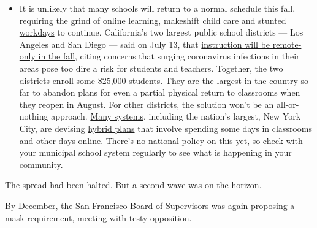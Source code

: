 \begin{itemize}
  \begin{itemize}
  \tightlist
  \item
    It is unlikely that many schools will return to a normal schedule
    this fall, requiring the grind of
    \href{https://www.nytimes3xbfgragh.onion/2020/06/05/us/coronavirus-education-lost-learning.html?action=click\&pgtype=Article\&state=default\&region=MAIN_CONTENT_3\&context=storylines_faq}{online
    learning},
    \href{https://www.nytimes3xbfgragh.onion/2020/05/29/us/coronavirus-child-care-centers.html?action=click\&pgtype=Article\&state=default\&region=MAIN_CONTENT_3\&context=storylines_faq}{makeshift
    child care} and
    \href{https://www.nytimes3xbfgragh.onion/2020/06/03/business/economy/coronavirus-working-women.html?action=click\&pgtype=Article\&state=default\&region=MAIN_CONTENT_3\&context=storylines_faq}{stunted
    workdays} to continue. California's two largest public school
    districts --- Los Angeles and San Diego --- said on July 13, that
    \href{https://www.nytimes3xbfgragh.onion/2020/07/13/us/lausd-san-diego-school-reopening.html?action=click\&pgtype=Article\&state=default\&region=MAIN_CONTENT_3\&context=storylines_faq}{instruction
    will be remote-only in the fall}, citing concerns that surging
    coronavirus infections in their areas pose too dire a risk for
    students and teachers. Together, the two districts enroll some
    825,000 students. They are the largest in the country so far to
    abandon plans for even a partial physical return to classrooms when
    they reopen in August. For other districts, the solution won't be an
    all-or-nothing approach.
    \href{https://bioethics.jhu.edu/research-and-outreach/projects/eschool-initiative/school-policy-tracker/}{Many
    systems}, including the nation's largest, New York City, are
    devising
    \href{https://www.nytimes3xbfgragh.onion/2020/06/26/us/coronavirus-schools-reopen-fall.html?action=click\&pgtype=Article\&state=default\&region=MAIN_CONTENT_3\&context=storylines_faq}{hybrid
    plans} that involve spending some days in classrooms and other days
    online. There's no national policy on this yet, so check with your
    municipal school system regularly to see what is happening in your
    community.
  \end{itemize}
\end{itemize}

The spread had been halted. But a second wave was on the horizon.

By December, the San Francisco Board of Supervisors was again proposing
a mask requirement, meeting with testy opposition.


